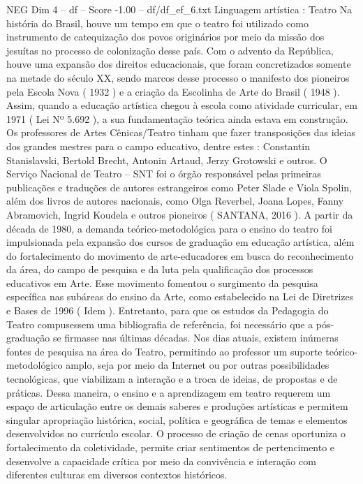 \begin{textsample}{NEG Dim 4 – df – Score -1.00 – df/df\_ef\_6.txt}  \label{ex:f4_neg_066}
Linguagem artística : Teatro Na história do Brasil, houve um tempo em que o teatro foi utilizado como instrumento de catequização dos povos originários por meio da missão dos jesuítas no processo de colonização desse país.
Com o advento da República, houve uma expansão dos direitos educacionais, que foram concretizados somente na metade do século XX, sendo marcos desse processo o manifesto dos pioneiros pela Escola Nova ( 1932 ) e a criação da Escolinha de Arte do Brasil ( 1948 ).
Assim, quando a educação artística chegou à escola como atividade curricular, em 1971 ( Lei Nº 5.692 ), a sua fundamentação teórica ainda estava em construção.
Os professores de Artes Cênicas/Teatro tinham que fazer transposições das ideias dos grandes mestres para o campo educativo, dentre estes : Constantin Stanislavski, Bertold Brecht, Antonin Artaud, Jerzy Grotowski e outros.
O Serviço Nacional de Teatro – SNT foi o órgão responsável pelas primeiras publicações e traduções de autores estrangeiros como Peter Slade e Viola Spolin, além dos livros de autores nacionais, como Olga Reverbel, Joana Lopes, Fanny Abramovich, Ingrid Koudela e outros pioneiros ( SANTANA, 2016 ).
A partir da década de 1980, a demanda teórico-metodológica para o ensino do teatro foi impulsionada pela expansão dos cursos de graduação em educação artística, além do fortalecimento do movimento de arte-educadores em busca do reconhecimento da área, do campo de pesquisa e da luta pela qualificação dos processos educativos em Arte.
Esse movimento fomentou o surgimento da pesquisa específica nas subáreas do ensino da Arte, como estabelecido na Lei de Diretrizes e Bases de 1996 ( Idem ).
Entretanto, para que os estudos da Pedagogia do Teatro compusessem uma bibliografia de referência, foi necessário que a pós-graduação se firmasse nas últimas décadas.
Nos dias atuais, existem inúmeras fontes de pesquisa na área do Teatro, permitindo ao professor um suporte teórico-metodológico amplo, seja por meio da Internet ou por outras possibilidades tecnológicas, que viabilizam a interação e a troca de ideias, de propostas e de práticas.
Dessa maneira, o ensino e a aprendizagem em teatro requerem um espaço de articulação entre os demais saberes e produções artísticas e permitem singular apropriação histórica, social, política e geográfica de temas e elementos desenvolvidos no currículo escolar.
O processo de criação de cenas oportuniza o fortalecimento da coletividade, permite criar sentimentos de pertencimento e desenvolve a capacidade crítica por meio da convivência e interação com diferentes culturas em diversos contextos históricos.

\end{textsample}
